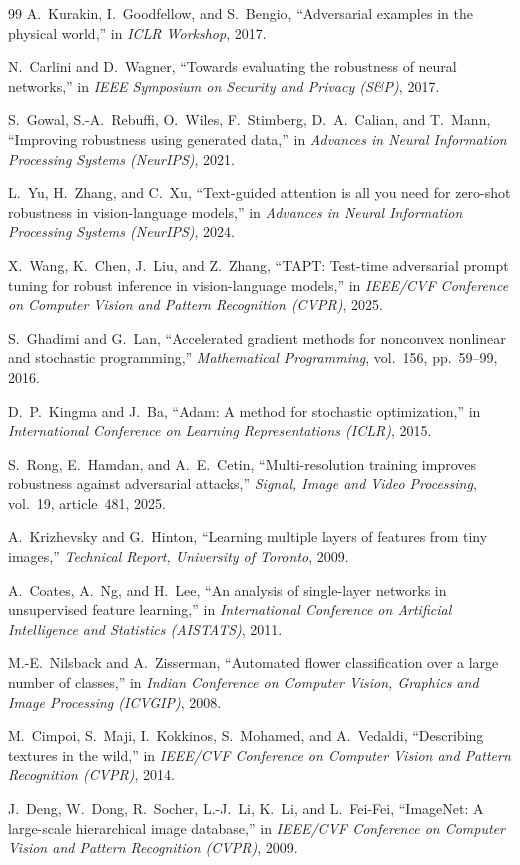 \documentclass[12pt,a4paper]{article}
\begin{document}
\begin{thebibliography}{99}
A.~Kurakin, I.~Goodfellow, and S.~Bengio,
``Adversarial examples in the physical world,''
in \emph{ICLR Workshop}, 2017.

N.~Carlini and D.~Wagner,
``Towards evaluating the robustness of neural networks,''
in \emph{IEEE Symposium on Security and Privacy (S\&P)}, 2017.

S.~Gowal, S.-A.~Rebuffi, O.~Wiles, F.~Stimberg, D.~A.~Calian, and T.~Mann,
``Improving robustness using generated data,''
in \emph{Advances in Neural Information Processing Systems (NeurIPS)}, 2021.

L.~Yu, H.~Zhang, and C.~Xu,
``Text-guided attention is all you need for zero-shot robustness in vision-language models,''
in \emph{Advances in Neural Information Processing Systems (NeurIPS)}, 2024.

X.~Wang, K.~Chen, J.~Liu, and Z.~Zhang,
``TAPT: Test-time adversarial prompt tuning for robust inference in vision-language models,''
in \emph{IEEE/CVF Conference on Computer Vision and Pattern Recognition (CVPR)}, 2025.

S.~Ghadimi and G.~Lan,
``Accelerated gradient methods for nonconvex nonlinear and stochastic programming,''
\emph{Mathematical Programming}, vol.~156, pp.~59--99, 2016.

D.~P.~Kingma and J.~Ba,
``Adam: A method for stochastic optimization,''
in \emph{International Conference on Learning Representations (ICLR)}, 2015.

S.~Rong, E.~Hamdan, and A.~E.~Cetin,
``Multi-resolution training improves robustness against adversarial attacks,''
\emph{Signal, Image and Video Processing}, vol.~19, article~481, 2025.

A.~Krizhevsky and G.~Hinton,
``Learning multiple layers of features from tiny images,''
\emph{Technical Report, University of Toronto}, 2009.

A.~Coates, A.~Ng, and H.~Lee,
``An analysis of single-layer networks in unsupervised feature learning,''
in \emph{International Conference on Artificial Intelligence and Statistics (AISTATS)}, 2011.

M.-E.~Nilsback and A.~Zisserman,
``Automated flower classification over a large number of classes,''
in \emph{Indian Conference on Computer Vision, Graphics and Image Processing (ICVGIP)}, 2008.

M.~Cimpoi, S.~Maji, I.~Kokkinos, S.~Mohamed, and A.~Vedaldi,
``Describing textures in the wild,''
in \emph{IEEE/CVF Conference on Computer Vision and Pattern Recognition (CVPR)}, 2014.

J.~Deng, W.~Dong, R.~Socher, L.-J.~Li, K.~Li, and L.~Fei-Fei,
``ImageNet: A large-scale hierarchical image database,''
in \emph{IEEE/CVF Conference on Computer Vision and Pattern Recognition (CVPR)}, 2009.

\end{thebibliography}
\end{document}
